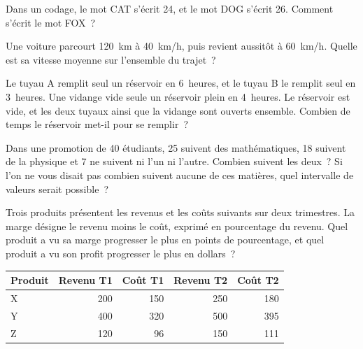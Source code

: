 \begin{question}\label{iq:iv1:sequences-patterns-and-aptitude:12}
Dans un codage, le mot CAT s'écrit 24, et le mot DOG s'écrit 26. Comment s'écrit le mot FOX~?
\end{question}

\begin{question}\label{iq:iv1:sequences-patterns-and-aptitude:13}
Une voiture parcourt 120~km à 40~km/h, puis revient aussitôt à 60~km/h. Quelle est sa vitesse moyenne sur l'ensemble du trajet~?
\end{question}

\begin{question}\label{iq:iv1:sequences-patterns-and-aptitude:14}
Le tuyau A remplit seul un réservoir en 6~heures, et le tuyau B le remplit seul en 3~heures. Une vidange vide seule un réservoir plein en 4~heures. Le réservoir est vide, et les deux tuyaux ainsi que la vidange sont ouverts ensemble. Combien de temps le réservoir met-il pour se remplir~?
\end{question}

\begin{question}\label{iq:iv1:sequences-patterns-and-aptitude:15}
Dans une promotion de 40 étudiants, 25 suivent des mathématiques, 18 suivent de la physique et 7 ne suivent ni l'un ni l'autre. Combien suivent les deux~? Si l'on ne vous disait pas combien suivent aucune de ces matières, quel intervalle de valeurs serait possible~?
\end{question}

\begin{question}\label{iq:iv1:sequences-patterns-and-aptitude:16}
Trois produits présentent les revenus et les coûts suivants sur deux trimestres. La marge désigne le revenu moins le coût, exprimé en pourcentage du revenu. Quel produit a vu sa marge progresser le plus en points de pourcentage, et quel produit a vu son profit progresser le plus en dollars~?

\smallskip
\begin{tabular}{lrrrr}
\hline
Produit & Revenu T1 & Coût T1 & Revenu T2 & Coût T2 \\
\hline
X & 200 & 150 & 250 & 180 \\
Y & 400 & 320 & 500 & 395 \\
Z & 120 & 96 & 150 & 111 \\
\hline
\end{tabular}
\end{question}

